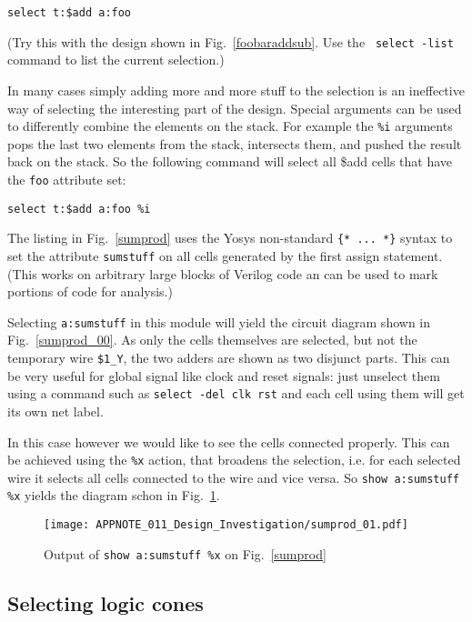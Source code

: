 \documentclass[9pt,technote,a4paper]{IEEEtran}
\begin{document}
\begin{verbatim}
select t:$add a:foo
\end{verbatim}

(Try this with the design shown in Fig.~\ref{foobaraddsub}. Use the {\tt
select -list} command to list the current selection.)

In many cases simply adding more and more stuff to the selection is an
ineffective way of selecting the interesting part of the design. Special
arguments can be used to differently combine the elements on the stack.
For example the {\tt \%i} arguments pops the last two elements from
the stack, intersects them, and pushed the result back on the stack. So the
following command will select all {\$add} cells that have the {\tt foo}
attribute set:

\begin{verbatim}
select t:$add a:foo %i
\end{verbatim}

The listing in Fig.~\ref{sumprod} uses the Yosys non-standard {\tt \{* ... *\}}
syntax to set the attribute {\tt sumstuff} on all cells generated by the first
assign statement. (This works on arbitrary large blocks of Verilog code an
can be used to mark portions of code for analysis.)

Selecting {\tt a:sumstuff} in this module will yield the circuit diagram shown
in Fig.~\ref{sumprod_00}. As only the cells themselves are selected, but not
the temporary wire {\tt \$1\_Y}, the two adders are shown as two disjunct
parts. This can be very useful for global signal like clock and reset signals: just
unselect them using a command such as {\tt select -del clk rst} and each cell
using them will get its own net label.

In this case however we would like to see the cells connected properly. This
can be achieved using the {\tt \%x} action, that broadens the selection, i.e.
for each selected wire it selects all cells connected to the wire and vice
versa. So {\tt show a:sumstuff \%x} yields the diagram schon in Fig.~\ref{sumprod_01}.

\begin{figure}[t]
\texttt{[image: APPNOTE\_011\_Design\_Investigation/sumprod\_01.pdf]}
\caption{Output of {\tt show a:sumstuff \%x} on Fig.~\ref{sumprod}}
\label{sumprod_01}
\end{figure}

\subsection{Selecting logic cones}
\end{document}
